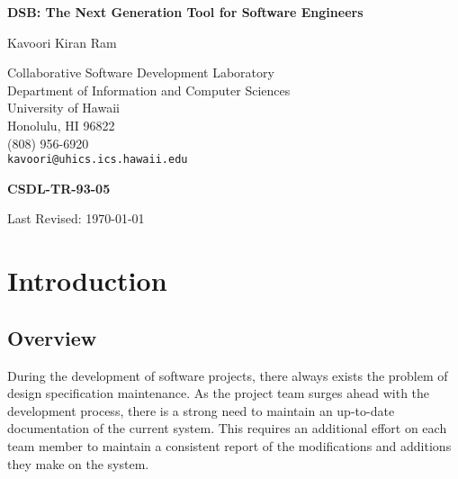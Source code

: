 
\begin{titlepage}
  

\vspace*{1in}
\begin{center}
  {\Large\bf DSB: The Next Generation Tool for Software Engineers} \bigskip\par

  Kavoori Kiran Ram                       \bigskip\par

  Collaborative Software Development Laboratory\\
  Department of Information and Computer Sciences\\
  University of Hawaii\\
  Honolulu, HI 96822\\
  (808) 956-6920\\
  {\tt kavoori@uhics.ics.hawaii.edu}           \bigskip\par
  
  {\bf CSDL-TR-93-05}                \bigskip\par
  
  Last Revised: \today
  
\end{center}
\end{titlepage}
\newpage


\tableofcontents
\newpage
          \section{ Introduction}

          \subsection{ Overview}
          
          During the development of software projects, there
          always exists the problem of design specification
          maintenance.  As the project team surges ahead
          with the development process, there is a strong
          need to maintain an up-to-date documentation of
          the current system.  This requires an additional
          effort on each team member to maintain a
          consistent report of the modifications and
          additions they make on the system.


